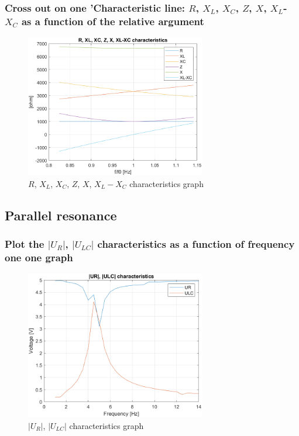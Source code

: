 \documentclass[]{scrartcl}
\begin{document}
\subsubsection{Cross out on one ’Characteristic line: $R$, $X_L$, $X_C$, $Z$, $X$, $X_L$-$X_C$ as a function of the relative argument}

\begin{figure}[H]
	\centering
	\includegraphics[width=0.7\textwidth]{Pictures/ct_char_03.png}
	\caption{$R$, $X_L$, $X_C$, $Z$, $X$, $X_L-X_C$ characteristics graph}
	\label{fig:R, XL, XC, Z, X, XL-XC char}
\end{figure}

\subsection{Parallel resonance}

\subsubsection{Plot the $|U_R|$, $|U_{LC}|$ characteristics as a function of frequency one one graph}

\begin{figure}[H]
	\centering
	\includegraphics[width=0.7\textwidth]{Pictures/ct_char_04.png}
	\caption{$|U_R|$, $|U_{LC}|$ characteristics graph}
	\label{fig:|UR|, |ULC| char}
\end{figure}
\end{document}
